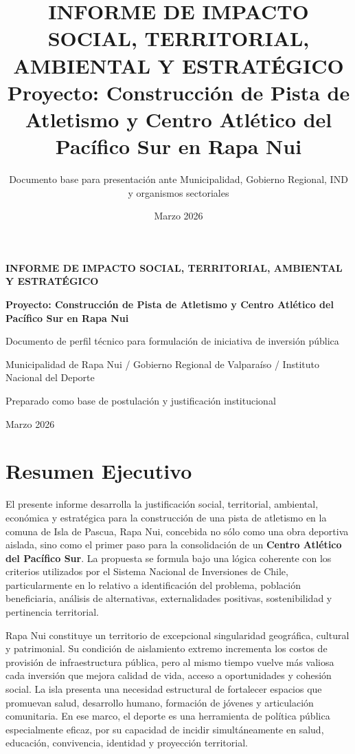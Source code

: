 \documentclass[12pt,letterpaper]{article}
\title{\textbf{INFORME DE IMPACTO SOCIAL, TERRITORIAL, AMBIENTAL Y ESTRATÉGICO}\\
\large Proyecto: Construcción de Pista de Atletismo y Centro Atlético del Pacífico Sur en Rapa Nui}
\author{Documento base para presentación ante Municipalidad, Gobierno Regional, IND y organismos sectoriales}
\date{Marzo 2026}
\begin{document}
\begin{titlepage}
    \centering
    \vspace*{2cm}
    {\Huge \textbf{INFORME DE IMPACTO SOCIAL, TERRITORIAL, AMBIENTAL Y ESTRATÉGICO}\par}
    \vspace{0.8cm}
    {\Large \textbf{Proyecto: Construcción de Pista de Atletismo y Centro Atlético del Pacífico Sur en Rapa Nui}\par}
    \vspace{1.5cm}
    {\large Documento de perfil técnico para formulación de iniciativa de inversión pública\par}
    \vspace{0.7cm}
    {\large Municipalidad de Rapa Nui / Gobierno Regional de Valparaíso / Instituto Nacional del Deporte\par}
    \vfill
    {\large Preparado como base de postulación y justificación institucional\par}
    \vspace{0.4cm}
    {\large Marzo 2026\par}
\end{titlepage}

\tableofcontents
\newpage

\section{Resumen Ejecutivo}

El presente informe desarrolla la justificación social, territorial, ambiental, económica y estratégica para la construcción de una pista de atletismo en la comuna de Isla de Pascua, Rapa Nui, concebida no sólo como una obra deportiva aislada, sino como el primer paso para la consolidación de un \textbf{Centro Atlético del Pacífico Sur}. La propuesta se formula bajo una lógica coherente con los criterios utilizados por el Sistema Nacional de Inversiones de Chile, particularmente en lo relativo a identificación del problema, población beneficiaria, análisis de alternativas, externalidades positivas, sostenibilidad y pertinencia territorial.

Rapa Nui constituye un territorio de excepcional singularidad geográfica, cultural y patrimonial. Su condición de aislamiento extremo incrementa los costos de provisión de infraestructura pública, pero al mismo tiempo vuelve más valiosa cada inversión que mejora calidad de vida, acceso a oportunidades y cohesión social. La isla presenta una necesidad estructural de fortalecer espacios que promuevan salud, desarrollo humano, formación de jóvenes y articulación comunitaria. En ese marco, el deporte es una herramienta de política pública especialmente eficaz, por su capacidad de incidir simultáneamente en salud, educación, convivencia, identidad y proyección territorial.
\end{document}
